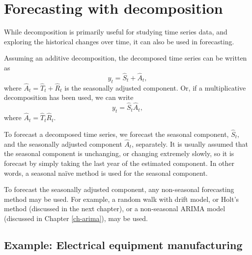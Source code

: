 \documentclass[]{book}
\newenvironment{Shaded}{\begin{snugshade}}{\end{snugshade}}
\newcommand{\DataTypeTok}[1]{\textcolor[rgb]{0.13,0.29,0.53}{#1}}
\newcommand{\DecValTok}[1]{\textcolor[rgb]{0.00,0.00,0.81}{#1}}
\newcommand{\KeywordTok}[1]{\textcolor[rgb]{0.13,0.29,0.53}{\textbf{#1}}}
\newcommand{\NormalTok}[1]{#1}
\newcommand{\OperatorTok}[1]{\textcolor[rgb]{0.81,0.36,0.00}{\textbf{#1}}}
\newcommand{\OtherTok}[1]{\textcolor[rgb]{0.56,0.35,0.01}{#1}}
\newcommand{\StringTok}[1]{\textcolor[rgb]{0.31,0.60,0.02}{#1}}
\begin{document}
\hypertarget{forecasting-with-decomposition}{%
\section{Forecasting with decomposition}\label{forecasting-with-decomposition}}

While decomposition is primarily useful for studying time series data, and exploring the historical changes over time, it can also be used in forecasting.

Assuming an additive decomposition, the decomposed time series can be written as
\[
  y_t = \hat{S}_t + \hat{A}_t,
\]
where \(\hat{A}_t = \hat{T}_t+\hat{R}_{t}\) is the seasonally adjusted component. Or, if a multiplicative decomposition has been used, we can write
\[
  y_t = \hat{S}_t\hat{A}_t,
\]
where \(\hat{A}_t = \hat{T}_t\hat{R}_{t}\).

To forecast a decomposed time series, we forecast the seasonal component, \(\hat{S}_t\), and the seasonally adjusted component \(\hat{A}_t\), separately. It is usually assumed that the seasonal component is unchanging, or changing extremely slowly, so it is forecast by simply taking the last year of the estimated component. In other words, a seasonal naïve method is used for the seasonal component.

To forecast the seasonally adjusted component, any non-seasonal forecasting method may be used. For example, a random walk with drift model, or Holt's method (discussed in the next chapter), or a non-seasonal ARIMA model (discussed in Chapter \ref{ch-arima}), may be used.

\hypertarget{example-electrical-equipment-manufacturing}{%
\subsection*{Example: Electrical equipment manufacturing}\label{example-electrical-equipment-manufacturing}}

\begin{Shaded}
\end{Shaded}
\end{document}
